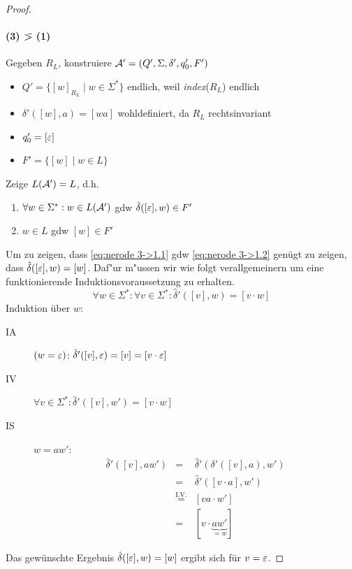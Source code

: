 \begin{proof}
\paragraph{(3) \=> (1)} Gegeben $R_L$, konstruiere $\mathcal{A}'=(Q',\Sigma,\delta',q_0',F')$
    \begin{itemize}
    \item $Q' = \{ [w]_{R_L} \mid w\in \Sigma^* \}$ \quad endlich, weil \textit{index}($R_L$) endlich
    \item $\delta'([w],a) = [wa]$ wohldefiniert, da $R_L$ rechtsinvariant
    \item $q_0' = [\varepsilon]$
    \item $F' = \{ [w] \mid w\in L \}$
    \end{itemize}
    Zeige $L(\mathcal{A}')=L$, d.h.
    \begin{enumerate}
    \item \label{eq:nerode 3->1.1} $\forall w\in \Sigma^* : w\in L(\mathcal{A}')$ gdw $\hat\delta([\varepsilon],w)\in F'$
    \item \label{eq:nerode 3->1.2} $w\in L$ gdw $[w]\in F'$ 
    \end{enumerate}
    
    Um zu zeigen, dass \ref{eq:nerode 3->1.1} gdw \ref{eq:nerode 3->1.2} genügt zu zeigen, dass $\hat\delta([\varepsilon], w) = [w]$.
                Daf"ur m"ussen wir wie folgt verallgemeinern um eine funktionierende Induktionsvoraussetzung zu erhalten.
    \begin{displaymath}
      \forall w\in\Sigma^* :
                        \forall v\in\Sigma^* : \hat\delta'([v],w) = [v\cdot w]
    \end{displaymath}
    Induktion über $w$:
    \begin{description}
    \item[IA] $(w = \varepsilon)$: $\hat\delta'([v],\varepsilon) = [v]=[v\cdot\varepsilon]$
    \item[IV] 
      $\forall v\in\Sigma^* : \hat\delta'([v],w') = [v\cdot w]$
    \item [IS] $w = aw'$:
      \begin{displaymath}
        \begin{array}{lcl}
        \hat\delta'([v],aw') &=& \hat\delta'(\delta'([v],a),w') \\
                             &=& \hat\delta'([v\cdot a],w') \\
                             &\stackrel{\text{I.V.}}{=}&[va\cdot w'] \\
                             &=& [v\cdot \underbrace{aw'}_{=w}]
        \end{array}
      \end{displaymath}
    \end{description}
                Das gewünschte Ergebnis $\hat\delta([\varepsilon], w) = [w]$ ergibt sich für $v=\varepsilon$. \qedhere
\end{proof}
